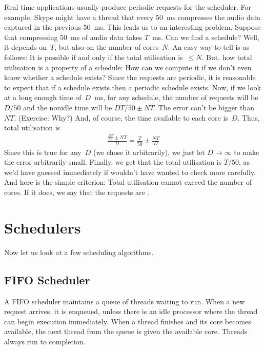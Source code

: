Real time applications usually produce periodic requests for the scheduler.
For example,
  Skype might have a thread that every $50$~ms compresses the audio data
  captured in the previous $50$~ms.
This leads us to an interesting problem.
Suppose that compressing $50$~ms of audio data takes $T$~ms.
Can we find a schedule?
Well, it depends on~$T$, but also on the number of cores~$N$.
An easy way to tell is as follows:
  It is possible if and only if the total utilisation is~$\le N$.
But, how total utilisation is a property of a schedule:
  How can we compute it if we don't even know whether a schedule exists?
Since the requests are periodic,
  it is reasonable to expect that if a schedule exists then a periodic schedule exists. 
Now, if we look at a long enough time of~$D$~ms,
  for any schedule,
    the number of requests will be $D/50$
    and the nonidle time will be $DT/50\pm NT$.
The error can't be bigger than $NT$. (Exercise: Why?)
And, of course, the time available to each core is~$D$.
Thus, total utilisation is
\begin{align*}
\frac{\frac{DT}{50} \pm NT}{D}
  = \frac{T}{50} \pm \frac{NT}{D}
\end{align*}
Since this is true for any~$D$ (we chose it arbitrarily),
  we just let $D\to\infty$ to make the error arbitrarily small.
Finally, we get that the total utilisation is $T/50$,
  as we'd have guessed immediately if wouldn't have wanted to check more carefully.
And here is the simple criterion:
  Total utilisation cannot exceed the number of cores.
If it does, we say that the requests are .



\section*{Schedulers}

Now let us look at a few scheduling algorithms.

\subsection*{FIFO Scheduler}

A FIFO scheduler maintains a queue of threads waiting to run.
When a new request arrives,
  it is enqueued,
  unless there is an idle processor where the thread can begin execution immediately.
When a thread finishes and its core becomes available,
  the next thread from the queue is given the available core.
Threads always run to completion.

